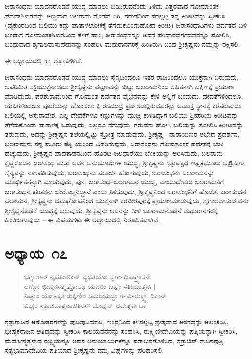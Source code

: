ಜರಾಸಂಧನು ಯಾದವರೊಡನೆ ಯುದ್ಧ ಮಾಡಲು ಬಂದಿರುವನೆಂದು ತಿಳಿದು ಎತ್ತರವಾದ ಗೋಮಾಂತಕ ಪರ್ವತಶಿಖರವನ್ನು ಅಣ್ಣನಾದ ಬಲರಾಮ ನೊಡನೆ ಏರಿ, ಗರುಡನಿಂದ ತರಲ್ಪಟ್ಟ ತನ್ನ ಕಿರೀಟವನ್ನು ಸ್ವೀಕರಿಸಿ (ವೈಕುಂಠದಿಂದ ಬಲಿಯು ಕದ್ದು ಪಾತಾಳಲೋಕಕ್ಕೆ ತೆಗೆದುಕೊಂಡುಹೋದ ಕಿರೀಟ) ಜರಾಸಂಧಾದಿಗಳು ಪರ್ವತದ ಬಳಿ ಬಂದಾಗ ಗೋಮಂತಕಶಿಖರದಿಂದ ಕೆಳಗೆ ಹಾರಿ, ಜರಾಸಂಧನನ್ನೂ ಅವನ ಪರಿವಾರವರ್ಗದವರನ್ನೂ ಸೋಲಿಸಿ, ಬಂಧುವಾದ ಶೃಗಾಲವಾಸುದೇವನನ್ನು ಸಂಹರಿಸಿ ಮಥುರಾನಗರಕ್ಕೆ ಹಿಂತಿರುಗಿ ಬಂದ ಶ‍್ರೀಕೃಷ್ಣನು ನಮ್ಮನ್ನು ರಕ್ಷಿಸಲಿ.

ಈ ಅಧ್ಯಾಯದಲ್ಲಿ ೩೩ ಶ್ಲೋಕಗಳಿವೆ.

ಜರಾಸಂಧನು ಯಾದವರೊಡನೆ ಯುದ್ಧ ಮಾಡಲು ಸೈನ್ಯದಿಂದಲೂ ಇತರ ರಾಜರಿಂದಲೂ ಯುಕ್ತನಾಗಿ ಬರುವುದು, ಅಪರಿಮಿತ ಶಕ್ತಿಯುಕ್ತನಾದರೂ ಶ‍್ರೀಕೃಷ್ಣನು ಪಟ್ಟಣವನ್ನು ಬಿಟ್ಟು ಬಲರಾಮನಿಂದ ಸಹಿತನಾಗಿ ದಕ್ಷಿಣಕ್ಕೆ ಪ್ರಯಾಣ ಮಾಡಿದುದು, ಪರಶುರಾಮರಿಂದ ಗೋಮಂತ ಪರ್ವತದ ವೈಭವವನ್ನು ಕೇಳಿ ಅಲ್ಲಿಗೆ ಬಂದುದು, ದೇವತೆಗಳಿಂದಲೂ, ಋಷಿಗಳಿಂದಲೂ ಪೂಜೆಯನ್ನು ಹೊಂದಲು ಕ್ಷೀರಸಮುದ್ರ ಪ್ರದೇಶದಲ್ಲಿರುವವರನ್ನು ಅಮುಕ್ತ ಸ್ಥಾನಕ್ಕೆ ಕರೆತರುವುದು, ಬಲಿಯಲ್ಲಿ ಅಸುರಾವೇಶ, ಎಲ್ಲ ದೇವತೆಗಳೂ ಕಣ್ಣುಗಳನ್ನು ಮುಚ್ಚಿ ಕುಳಿತಿದ್ದಾಗ ಬಲಿಯು ಶ‍್ರೀಹರಿಯ ಕಿರೀಟವನ್ನು ತೆಗೆದುಕೊಂಡು ಪಾತಾಳಕ್ಕೆ ಓಡುವುದು, ಎಲ್ಲರೂ ನಗುವುದು, ಗರುಡನು ಹೋಗಿ ಬಲಿಯನ್ನು ಸೋಲಿಸಿ ಕಿರೀಟವನ್ನು ತರುವುದು, ಅದನ್ನು ಶ‍್ರೀಕೃಷ್ಣನ ತಲೆಯಲ್ಲಿಟ್ಟು ಸ್ತೋತ್ರ ಮಾಡುವುದು, ಶ‍್ರೀಕೃಷ್ಣ –ನಾರಾಯಣರ ಅಭೇದ ಪ್ರದರ್ಶನ, ಬಲರಾಮನು ತನ್ನ ಮೂರು ಪತ್ನಿ ಯರಿಂದ ವಿಹರಿಸುವುದು, ಜರಾಸಂಧನು ಗೋಮಾಂತಕ ಪರ್ವತಕ್ಕೆ ಬೆಂಕಿ ಹಚ್ಚುವುದು, ಶ‍್ರೀಕೃಷ್ಣನ ಪಾದತಾಡನದಿಂದ ಹೊರಟ ಜಲಧಾರೆಯು ಬೆಂಕಿಯನ್ನು ಆರಿಸಿದುದು, ಬಲರಾಮ ಕೃಷ್ಣರೊಡನೆ ಜರಾಸಂಧ ಮತ್ತು ಅವನ ಅನುಯಾಯಿಗಳ ಯುದ್ಧ, ಶ‍್ರೀಕೃಷ್ಣನು ಶತ್ರುಪಕ್ಷದ ಇಪ್ಪತ್ತಮೂರು ಅಕ್ಷೌಹಿಣೀ ಸೈನ್ಯವನ್ನು ನಾಶಪಡಿಸುವುದು, ಜರಾಸಂಧನು ಮೂರ್ಛ ಹೋಗುವುದು, ಜರಾಸಂಧನು ಬಲರಾಮನನ್ನು ಮೂರ್ಛಿತನನ್ನಾಗಿ ಮಾಡುವುದು, ಪುನಃ ಜರಾಸಂಧ–ಬಲರಾಮರ ಯುದ್ದ, ವಾಯುದೇವರು ಬಲರಾಮನಿಗೆ ಜರಾಸಂಧನ ಹಂತಕನು ಬೇರೊಬ್ಬನಿದ್ದಾನೆ ಎಂದು ತಿಳಿಸುವುದು, ಶ‍್ರೀಕೃಷ್ಣನಿಂದ ಜರಾಸಂಧನಿಗೆ ಹೊಡೆತ, ಜರಾಸಂಧನ ಪಲಾಯನ, ಶ‍್ರೀಕೃಷ್ಣನು ದಮಘೋಷನಿಂದ ಯುಕ್ತನಾಗಿ ಕರವೀರಪುರಕ್ಕೆ ಪ್ರಯಾಣಮಾಡುವುದು, ಶೃಗಾಲವಾಸುದೇವನು ಶ‍್ರೀಕೃಷ್ಣನೊಡನೆ ಯುದ್ಧಕ್ಕೆ ಬರುವುದು. ಶ‍್ರೀಕೃಷ್ಣನು ಅವನನ್ನು ಸೀಳಿ ಬಲರಾಮನೊಡನೆ ಮಥುರಾನಗರಕ್ಕೆ ಹಿಂತಿರುಗುವುದು – ಈ ವಿಷಯಗಳು ಈ ಅಧ್ಯಾಯದಲ್ಲಿ ನಿರೂಪಿತವಾಗಿವೆ.


\section{ಅಧ್ಯಾಯ–೧೭}

\begin{verse}
ಭಗ್ನಾಶಾನ್ ನೃಪತೀನರೀನ್ ವ್ಯಥತಯೋ ಸ್ವರ್ಗಾಧಿಪಾಗ್ರ್ಯಾಸನೇ \\ ಲಗ್ನೋ ಭೀಷ್ಮಕಸತ್ಕೃತ್ತೋಽಥ ಯವನಂ ಜಘ್ನೇ ಸತೀಮಾತ್ಮನಃ |\\ ನಿಘ್ನಾಂ ಯೋಽಕೃತ ರುಕ್ಕಿಣೀಂ ಸಮಜಯದ್ದು ರ್ಗರ್ವಿರುಕ್ಮ್ಯಾ ದಿಕಾನ್ \\ ವಿಘ್ನಂ ಸತ್ರಾಜಿದಾತ್ಮಜಾಪತಿರಸೌ ಮೇಘ್ನನ್ ಭವೇತ್ಸರ್ವದಾ ||
\end{verse}

ಶತ್ರುರಾಜರ ಆಶೋತ್ತರಗಳನ್ನು ಪುಡಿಪುಡಿಮಾಡಿ, ಇಂದ್ರನಿಂದ ಕಳಿಸಲ್ಪಟ್ಟ ಶ್ರೇಷ್ಠವಾದ ಆಸನವನ್ನು ಅಲಂಕರಿಸಿ, ಭೀಷ್ಮಕರಾಜನ ಆತಿಥ್ಯವನ್ನು ಸ್ವೀಕರಿಸಿ ಕಾಲಯವನನನ್ನು ಸಂಹರಿಸಿ, ರುಕ್ಷ್ಮಿಣೀದೇವಿಯನ್ನು ಪತ್ನಿಯನ್ನಾಗಿ ಸ್ವೀಕರಿಸಿ, ಮದೋನ್ಮತ್ತನಾದ ರುಕ್ಷ್ಮಿಯನ್ನೂ ಅವನ ಅನುಯಾಯಿಗಳನ್ನೂ ಪರಾಭವಗೊಳಿಸಿದ, ಸತ್ರಾಜಿತ್ ರಾಜನಪುತ್ರಿ ಸತ್ಯಭಾಮಾದೇವಿಯ ಪತಿಯಾದ ಶ‍್ರೀಕೃಷ್ಣನು ನಮ್ಮ ವಿಘ್ನಗಳನ್ನು ಪರಿಹರಿಸಲಿ.

